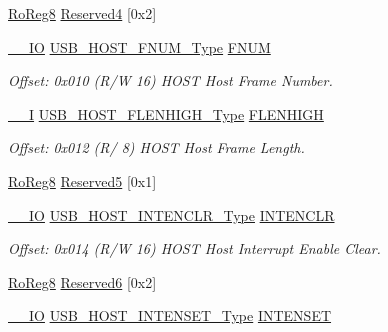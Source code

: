 \begin{DoxyCompactItemize}
\mbox{\hyperlink{group___s_a_m_d21_e15_a__definitions_ga0d957f1433aaf5d70e4dc2b68288442d}{Ro\+Reg8}} \mbox{\hyperlink{struct_usb_host_aec3221203f6f367a8473128fc2f5429e}{Reserved4}} \mbox{[}0x2\mbox{]}
\item 
\mbox{\hyperlink{core__cm0plus_8h_aec43007d9998a0a0e01faede4133d6be}{\+\_\+\+\_\+\+IO}} \mbox{\hyperlink{union_u_s_b___h_o_s_t___f_n_u_m___type}{U\+S\+B\+\_\+\+H\+O\+S\+T\+\_\+\+F\+N\+U\+M\+\_\+\+Type}} \mbox{\hyperlink{struct_usb_host_ab81f4ba4820ccbeeddd23394d96aa981}{F\+N\+UM}}
\begin{DoxyCompactList}\small\item\em Offset\+: 0x010 (R/W 16) H\+O\+ST Host Frame Number. \end{DoxyCompactList}\item 
\mbox{\hyperlink{core__cm0plus_8h_af63697ed9952cc71e1225efe205f6cd3}{\+\_\+\+\_\+I}} \mbox{\hyperlink{union_u_s_b___h_o_s_t___f_l_e_n_h_i_g_h___type}{U\+S\+B\+\_\+\+H\+O\+S\+T\+\_\+\+F\+L\+E\+N\+H\+I\+G\+H\+\_\+\+Type}} \mbox{\hyperlink{struct_usb_host_a9804b2524fcb19f158a965f1e3856ba3}{F\+L\+E\+N\+H\+I\+GH}}
\begin{DoxyCompactList}\small\item\em Offset\+: 0x012 (R/ 8) H\+O\+ST Host Frame Length. \end{DoxyCompactList}\item 
\mbox{\hyperlink{group___s_a_m_d21_e15_a__definitions_ga0d957f1433aaf5d70e4dc2b68288442d}{Ro\+Reg8}} \mbox{\hyperlink{struct_usb_host_a7321f81c873f0c6c846004e246ac204d}{Reserved5}} \mbox{[}0x1\mbox{]}
\item 
\mbox{\hyperlink{core__cm0plus_8h_aec43007d9998a0a0e01faede4133d6be}{\+\_\+\+\_\+\+IO}} \mbox{\hyperlink{union_u_s_b___h_o_s_t___i_n_t_e_n_c_l_r___type}{U\+S\+B\+\_\+\+H\+O\+S\+T\+\_\+\+I\+N\+T\+E\+N\+C\+L\+R\+\_\+\+Type}} \mbox{\hyperlink{struct_usb_host_aafd20ac677f26b7ae351e011ce8453d9}{I\+N\+T\+E\+N\+C\+LR}}
\begin{DoxyCompactList}\small\item\em Offset\+: 0x014 (R/W 16) H\+O\+ST Host Interrupt Enable Clear. \end{DoxyCompactList}\item 
\mbox{\hyperlink{group___s_a_m_d21_e15_a__definitions_ga0d957f1433aaf5d70e4dc2b68288442d}{Ro\+Reg8}} \mbox{\hyperlink{struct_usb_host_a8e9dcdbe22cc3e20d4b45b25938767e2}{Reserved6}} \mbox{[}0x2\mbox{]}
\item 
\mbox{\hyperlink{core__cm0plus_8h_aec43007d9998a0a0e01faede4133d6be}{\+\_\+\+\_\+\+IO}} \mbox{\hyperlink{union_u_s_b___h_o_s_t___i_n_t_e_n_s_e_t___type}{U\+S\+B\+\_\+\+H\+O\+S\+T\+\_\+\+I\+N\+T\+E\+N\+S\+E\+T\+\_\+\+Type}} \mbox{\hyperlink{struct_usb_host_a42b381acfa790828dcbf1f08c09467b0}{I\+N\+T\+E\+N\+S\+ET}}

\end{DoxyCompactItemize}
